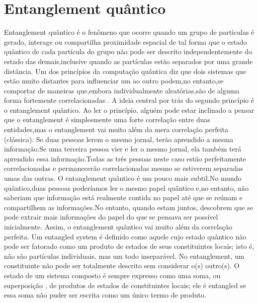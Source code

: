 \documentclass{report}
\begin{document}
\section{Entanglement quântico}
Entanglement quântico é o fenômeno que ocorre quando um grupo de partículas é gerado, interage ou compartilha proximidade espacial de tal forma que o estado quântico de cada partícula do grupo não pode ser descrito independentemente do estado das demais,inclusive quando as partículas estão separados por uma grande distância.
\newline
Um dos princípios da computação quântica diz que dois sistemas que estão muito distantes para influenciar um ao outro podem,no entanto,se comportar de maneiras que,embora individualmente aleatórias,são de alguma forma fortemente correlacionadas .
A ideia central por trás do segundo princípio é o entanglement quântico. Ao ler o princípio, alguém pode estar inclinado a pensar que o entanglement é simplesmente uma forte correlação entre duas entidades,mas o entanglement vai muito além da mera correlação perfeita (clássica). Se duas pessoas lerem o mesmo jornal, terão aprendido a mesma informação.Se uma terceira pessoa vier e ler o mesmo jornal, ela também terá aprendido essa informação.Todas as três pessoas neste caso estão perfeitamente correlacionadas e permanecerão correlacionadas mesmo se estiverem separadas umas das outras.
O entanglement quântico é um pouco mais subtil.No mundo quântico,duas pessoas poderíamos ler o mesmo papel quântico e,no entanto, não saberiam que informação está realmente contida no papel até que se reúnam e compartilhem as informações.No entanto, quando estam juntos, descobrem que se pode extrair mais informações do papel do que se pensava ser possível inicialmente. Assim, o entanglement quântico vai muito além da correlação perfeita.
\newline
Um entangled system é definido como aquele cujo estado quântico não pode ser fatorado como um produto de estados de seus constituintes locais; isto é, não são partículas individuais, mas um todo inseparável. No entanglement, um constituinte não pode ser totalmente descrito sem considerar o(s) outro(s). O estado de um sistema composto é sempre expresso como uma soma, ou superposição , de produtos de estados de constituintes locais; ele é entangled se essa soma não puder ser escrita como um único termo de produto.
\newline
\end{document}
